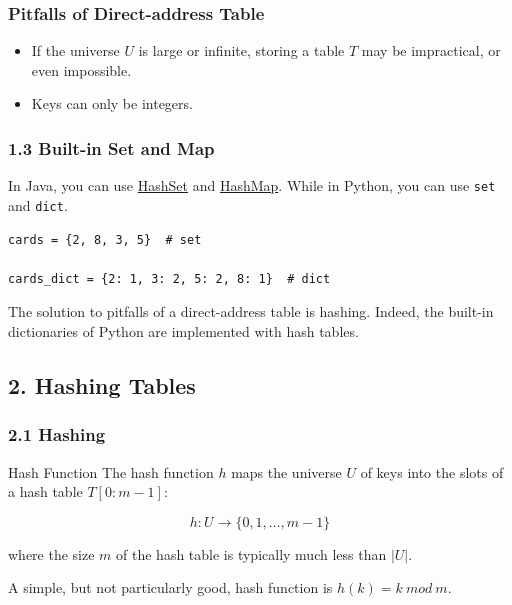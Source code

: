 \documentclass[aspectratio=169, 14pt]{beamer}
\begin{document}
\begin{frame}
    \frametitle{Pitfalls of Direct-address Table}

    \begin{itemize}
        \item If the universe $U$ is large or infinite, storing a table $T$ may be impractical, or even impossible.
        \item Keys can only be integers.
    \end{itemize}
\end{frame}

\begin{frame}[fragile]
    \frametitle{1.3 Built-in Set and Map}
 In Java, you can use \href{https://docs.oracle.com/en/java/javase/11/docs/api/java.base/java/util/HashSet.html}{HashSet} and \href{https://docs.oracle.com/en/java/javase/11/docs/api/java.base/java/util/HashMap.html}{HashMap}. While in Python, you can use \texttt{set} and \texttt{dict}. 

\begin{verbatim}
cards = {2, 8, 3, 5}  # set

cards_dict = {2: 1, 3: 2, 5: 2, 8: 1}  # dict
\end{verbatim}

The solution to pitfalls of a direct-address table is \alert{hashing}. Indeed, the built-in dictionaries of Python are implemented with hash tables.

\end{frame}

\begin{frame}

    \section{\textcolor{darkmidnightblue}{2. Hashing Tables}}
\end{frame}

\begin{frame}
    \frametitle{2.1 Hashing}
\begin{exampleblock}{Hash Function}
The hash function $h$ maps the universe $U$ of keys into the slots of a \alert{hash table} $T[0:m-1]$:   

\[h: U \rightarrow \{0, 1, \dots, m - 1\}\]

where the size $m$ of the hash table is typically much less than $|U|$.
\end{exampleblock}
    
A simple, but not particularly good, hash function is $h(k) = k \ mod \ m$.
\end{frame}
\end{document}
